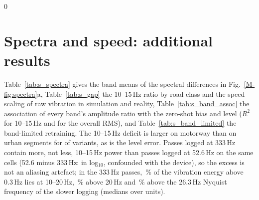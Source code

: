 \documentclass[onecolumn,10pt]{IEEEtran}
\providecommand{\tenpage}{0}
\begin{document}
\tenpage\else\fi






\section{Spectra and speed: additional results}
\label{sec:s_spectra}
Table~\ref{tab:s_spectra} gives the band means of the spectral differences in Fig.~\ref{M-fig:spectra}a, Table~\ref{tab:s_gap} the 10--15\,Hz ratio by road class and the speed scaling of raw vibration in simulation and reality, Table~\ref{tab:s_band_assoc} the association of every band's amplitude ratio with the zero-shot bias and level ($R^2$ \baRtwoHighBias{} for 10--15\,Hz and \baRtwoRmsBias{} for the overall RMS), and Table~\ref{tab:s_band_limited} the band-limited retraining.
The 10--15\,Hz deficit is larger on motorway than on urban segments for \bgcMotorwayLarger{} of \bgcNvar{} variants, as is the level error.
Passes logged at 333\,Hz contain more, not less, 10--15\,Hz power than passes logged at 52.6\,Hz on the same cells (52.6 minus 333\,Hz: \spAliasHigh{} in log$_{10}$, confounded with the device), so the excess is not an aliasing artefact; in the 333\,Hz passes, \hfTenTwenty\,\% of the vibration energy above 0.3\,Hz lies at 10--20\,Hz, \hfAboveTwenty\,\% above 20\,Hz and \hfAboveNyq\,\% above the 26.3\,Hz Nyquist frequency of the slower logging (medians over \hfUnits{} units).
\end{document}
